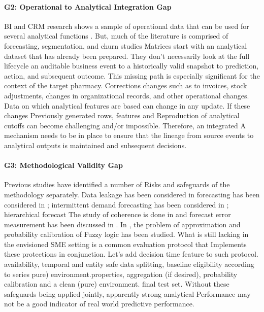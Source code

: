 \documentclass[a4paper,11pt,oneside]{book}
\theoremstyle{plain}
\theoremstyle{definition}
\theoremstyle{remark}
\begin{document}
\paragraph{G2: Operational to Analytical Integration Gap}
BI and CRM research shows a sample of operational data that can be used for several analytical functions \cite{chen2012business}. But, much of the literature is comprised of forecasting, segmentation, and churn studies Matrices start with an analytical dataset that has already been prepared. They don't necessarily look at the full lifecycle an auditable business event to a historically valid snapshot to prediction, action, and subsequent outcome. This missing path is especially significant for the context of the target pharmacy. Corrections changes such as to invoices, stock adjustments, changes in organizational records, and other operational changes. Data on which analytical features are based can change in any update. If these changes Previously generated rows, features and Reproduction of analytical cutoffs can become challenging and/or impossible. Therefore, an integrated A mechanism needs to be in place to ensure that the lineage from source events to analytical outputs is maintained and subsequent decisions.

\paragraph{G3: Methodological Validity Gap}
Previous studies have identified a number of Risks and safeguards of the methodology separately. Data leakage has been considered in forecasting has been considered in \cite{kaufman2012leakage}; intermittent demand forecasting has been considered in \cite{croston1972intermittent,syntetos2005intermittent}; hierarchical forecast The study of coherence is done in \cite{hyndman2011hierarchical} and forecast error measurement has been discussed in \cite{hyndman2006accuracy}. In \cite{niculescu2005calibration}, the problem of approximation and probability calibration of Fuzzy logic has been studied. What is still lacking in the envisioned SME setting is a common evaluation protocol that Implements these protections in conjunction. Let's add decision time feature to such protocol. availability, temporal and entity safe data splitting, baseline eligibility according to series pure) environment.properties, aggregation (if desired), probability calibration and a clean (pure) environment. final test set. Without these safeguards being applied jointly, apparently strong analytical Performance may not be a good indicator of real world predictive performance.
\end{document}
